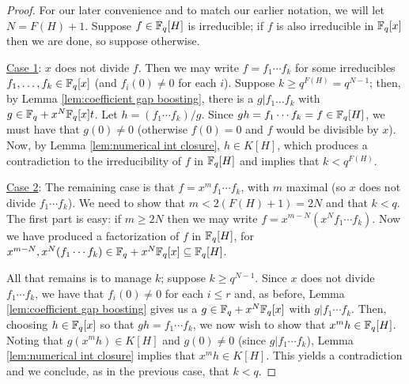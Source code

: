 \begin{proof}
	For our later convenience and to match our earlier notation, we will let $N = F(H)+1$.
	Suppose $f\in \mathbb{F}_q[H]$ is irreducible; if $f$ is also irreducible in $\mathbb{F}_q[x]$ then we are done, so suppose otherwise.  
	
	\underline{Case 1}: $x$ does not divide $f$.
	Then we may write $f = f_1\cdots f_k$ for some irreducibles $f_1,\dots,f_k\in \mathbb{F}_q[x]$ (and $f_i(0)\neq0$ for each $i$).
	Suppose $k\ge q^{F(H)} = q^{N-1}$; then, by Lemma \ref{lem:coefficient gap boosting}, there is a $g|f_1\dots f_k$ with $g\in \mathbb{F}_q+x^N \mathbb{F}_q[x]t$.
	Let $h = (f_1\cdots f_k)/g$.
	Since $gh = f_1\cdots f_k = f \in \mathbb{F}_q[H]$, we must have that $g(0) \neq 0$ (otherwise $f(0)=0$ and $f$ would be divisible by $x$).
	Now, by Lemma \ref{lem:numerical int closure}, $h\in K[H]$, which produces a contradiction to the irreducibility of $f$ in $\mathbb{F}_q[H]$ and implies that $k < q^{F(H)}$.
	
	\underline{Case 2}: The remaining case is that $f = x^m f_1\cdots f_k$, with $m$ maximal (so $x$ does not divide $f_1\cdots f_k$).
	We need to show that $m<2(F(H)+1) = 2N$ and that $k<q$.
	The first part is easy: if $m\ge 2N$ then we may write $f = x^{m-N} (x^N f_1\cdots f_k)$.
	Now we have produced a factorization of $f$ in $\mathbb{F}_q[H]$, for $x^{m-N}, x^N (f_1\cdots f_k) \in \mathbb{F}_q + x^N \mathbb{F}_q[x] \subseteq \mathbb{F}_q[H]$.
	
	All that remains is to manage $k$; suppose $k \ge q^{N-1}$.
	Since $x$ does not divide $f_1 \cdots f_k$, we have that $f_i(0) \neq 0$ for each $i\le r$ and, as before, Lemma \ref{lem:coefficient gap boosting} gives us a $g\in \mathbb{F}_q+x^N \mathbb{F}_q[x]$ with $g|f_1\cdots f_k$.
	Then, choosing $h\in \mathbb{F}_q[x]$ so that $gh = f_1\cdots f_k$, we now wish to show that $x^m h \in \mathbb{F}_q[H]$.
	Noting that $g (x^m h)\in K[H]$ and $g(0) \neq 0$ (since $g|f_1\cdots f_k$), Lemma \ref{lem:numerical int closure} implies that $x^m h\in K[H]$.
	This yields a contradiction and we conclude, as in the previous case, that $k< q$.
\end{proof}

